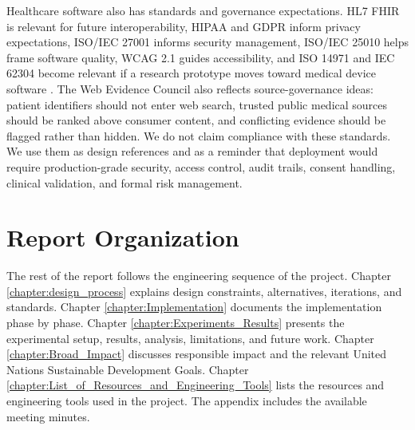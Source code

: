 Healthcare software also has standards and governance expectations. HL7 FHIR is relevant for future interoperability, HIPAA and GDPR inform privacy expectations, ISO/IEC 27001 informs security management, ISO/IEC 25010 helps frame software quality, WCAG 2.1 guides accessibility, and ISO 14971 and IEC 62304 become relevant if a research prototype moves toward medical device software \cite{hl7fhir,hipaa,gdpr,iso27001,iso25010,wcag21,iso14971,iec62304}. The Web Evidence Council also reflects source-governance ideas: patient identifiers should not enter web search, trusted public medical sources should be ranked above consumer content, and conflicting evidence should be flagged rather than hidden. We do not claim compliance with these standards. We use them as design references and as a reminder that deployment would require production-grade security, access control, audit trails, consent handling, clinical validation, and formal risk management.

\section{Report Organization}

The rest of the report follows the engineering sequence of the project. Chapter \ref{chapter:design_process} explains design constraints, alternatives, iterations, and standards. Chapter \ref{chapter:Implementation} documents the implementation phase by phase. Chapter \ref{chapter:Experiments_Results} presents the experimental setup, results, analysis, limitations, and future work. Chapter \ref{chapter:Broad_Impact} discusses responsible impact and the relevant United Nations Sustainable Development Goals. Chapter \ref{chapter:List_of_Resources_and_Engineering_Tools} lists the resources and engineering tools used in the project. The appendix includes the available meeting minutes.
